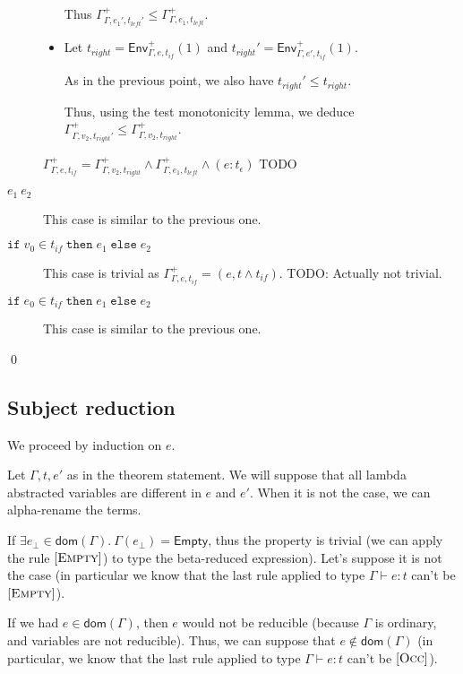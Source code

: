 \documentclass[a4paper]{article}%
\newcommand{\dom}[1]{\textsf{dom}(#1)}
\newcommand{\Empty} {\textsf{Empty}}%
\newcommand{\ite}[4]{\ensuremath{\texttt{if}\;#1\in#2\;\texttt{then}\;#3\;\texttt{else}\;#4}}
\newcommand{\Gp}[2]{\textsf{Env}^{#1}_{#2}}
\theoremstyle{definition}
\newcommand {\Rule}[1] {[\textsc{#1}]}
\begin{document}
\begin{description}
\begin{itemize}
        Thus $\Gamma^+_{\Gamma,e_1',t_{left}'} \leq \Gamma^+_{\Gamma,e_1,t_{left}}$.

        \item Let $t_{right} = \Gp + {\Gamma,e,t_{if}} (1)$ and $t_{right}' = \Gp + {\Gamma,e',t_{if}} (1)$.
        
        As in the previous point, we also have $t_{right}' \leq t_{right}$.

        Thus, using the test monotonicity lemma, we deduce $\Gamma^+_{\Gamma,v_2,t_{right}'} \leq \Gamma^+_{\Gamma,v_2,t_{right}}$.
      \end{itemize}
      
      $\Gamma^+_{\Gamma,e,t_{if}} = \Gamma^+_{\Gamma,v_2,t_{right}} \land \Gamma^+_{\Gamma,e_1,t_{left}} \land (e:t_\epsilon)$ TODO

      \item[$e_1\ e_2$] This case is similar to the previous one.
      \item[$\ite {v_0} {t_{if}} {e_1} {e_2}$] This case is trivial as $\Gamma^+_{\Gamma,e,t_{if}} = (e, t\land t_{if})$. TODO: Actually not trivial.
      \item[$\ite {e_0} {t_{if}} {e_1} {e_2}$] This case is similar to the previous one.
    \end{description}

    \qed

    \subsection{Subject reduction}

    We proceed by induction on $e$.

    Let $\Gamma,t,e'$ as in the theorem statement.
    We will suppose that all lambda abstracted variables are different in $e$ and $e'$. When it is not the case, we can alpha-rename the terms.

    If $\exists e_{\bot} \in \dom\Gamma.\ \Gamma(e_{\bot}) = \Empty$, thus the property is trivial
    (we can apply the rule $\Rule {Empty}$) to type the beta-reduced expression).
    Let's suppose it is not the case (in particular we know that the last rule applied to type $\Gamma \vdash e:t$ can't be $\Rule{Empty}$).

    If we had $e\in\dom\Gamma$, then $e$ would not be reducible (because $\Gamma$ is ordinary, and variables are not reducible).
    Thus, we can suppose that $e\not\in\dom\Gamma$ (in particular, we know that the last rule applied to type $\Gamma \vdash e:t$ can't be $\Rule{Occ}$).
\end{document}
